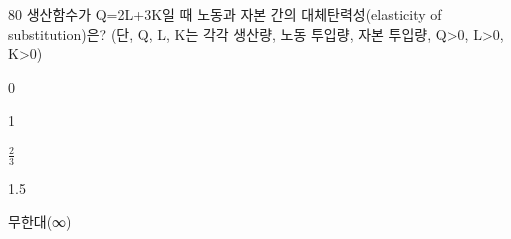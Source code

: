 \begin{question}{80}
생산함수가 Q=2L+3K일 때 노동과 자본 간의 대체탄력성(elasticity of substitution)은? (단, Q, L, K는 각각 생산량, 노동 투입량, 자본 투입량, Q>0, L>0, K>0)
\begin{choices}
  \item 0
  \item 1
  \item $\frac{ 2 } { 3 }$
  \item 1.5
  \item 무한대(∞)
\end{choices}
\end{question}
